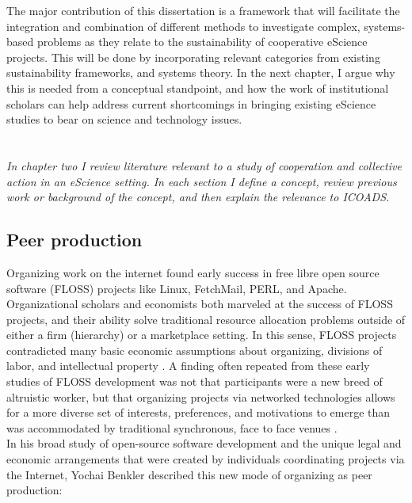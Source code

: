 \documentclass[thesis,tocnosub,noragright,centerchapter,12pt]{uiucecethesis09}
\begin{document}
The major contribution of this dissertation is a framework that will facilitate the integration and combination of different methods to investigate complex, systems-based problems as they relate to the sustainability of cooperative eScience projects. This will be done by incorporating relevant categories from existing sustainability frameworks, and systems theory. In the next chapter, I argue why this is needed from a conceptual standpoint, and how the work of institutional scholars can help address current shortcomings in bringing existing eScience studies to bear on science and technology issues. 

\chapter{}

\emph{In chapter two I review literature relevant
to a study of cooperation and collective action in an eScience setting.  In each section I define a concept, review previous work
or background of the concept, and then explain the relevance to ICOADS.}

\section{Peer production}

Organizing work on the internet found early success in free libre open source software
(FLOSS) projects like Linux, FetchMail, PERL, and Apache. Organizational scholars \citep{lakhani2003open, lakhani2005hackers} and economists \citep{lerner2002some, hars2001working} both  marveled at the success of FLOSS projects, and their ability  solve traditional resource allocation problems outside of either a firm (hierarchy) or a marketplace setting. In this sense, FLOSS projects contradicted many basic economic assumptions about organizing, divisions of labor, and intellectual property \citep[e.g.][]{coase1937nature, schumpeter1942capitalism, becker1976economic}. A finding often repeated from these early studies of FLOSS development was not that participants were a new breed of altruistic worker, but that organizing projects via networked technologies allows for a more diverse set of interests, preferences, and motivations to emerge than was accommodated by traditional synchronous,  face to face venues \citep{benkler2006commons}.\\

In his broad study of open-source software development and the unique
legal and economic arrangements that were created by individuals
coordinating projects via the Internet, Yochai Benkler described this
new mode of organizing as peer production:
\end{document}

